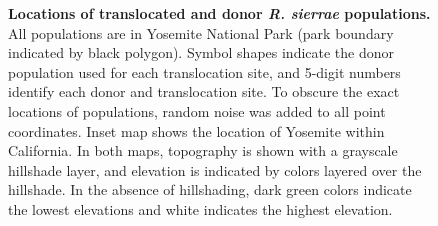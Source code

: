 \documentclass[
  letterpaper,
  DIV=11,
  numbers=noendperiod]{scrartcl}
\begin{document}
\newpage

\begin{figure}


\caption{\label{fig-yosemap}\textbf{Locations of translocated and donor
\emph{R. sierrae} populations.} All populations are in Yosemite National
Park (park boundary indicated by black polygon). Symbol shapes indicate
the donor population used for each translocation site, and 5-digit
numbers identify each donor and translocation site. To obscure the exact
locations of populations, random noise was added to all point
coordinates. Inset map shows the location of Yosemite within California.
In both maps, topography is shown with a grayscale hillshade layer, and
elevation is indicated by colors layered over the hillshade. In the
absence of hillshading, dark green colors indicate the lowest elevations
and white indicates the highest elevation.}

\end{figure}%
\end{document}
